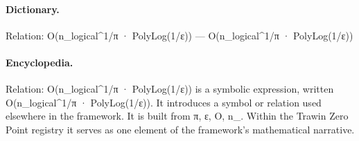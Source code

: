 \paragraph{Dictionary.}
Relation: O(n\_logical\textasciicircum{}1/π · PolyLog(1/ε)) — O(n\_logical\textasciicircum{}1/π · PolyLog(1/ε))

\paragraph{Encyclopedia.}
Relation: O(n\_logical\textasciicircum{}1/π · PolyLog(1/ε)) is a symbolic expression, written O(n\_logical\textasciicircum{}1/π · PolyLog(1/ε)). It introduces a symbol or relation used elsewhere in the framework. It is built from π, ε, O, n\_. Within the Trawin Zero Point registry it serves as one element of the framework's mathematical narrative.
